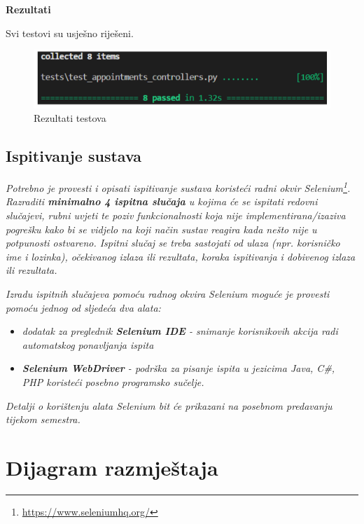	 \textbf{Rezultati}
	 
	 
	 Svi testovi su usješno riješeni.
	 
	 \begin{figure}[H]
				\includegraphics[scale=0.3]{slike/rezultati_testova.PNG} %
				\centering
				\caption{Rezultati testova}
				\label{fig:rezultati_testova}
			\end{figure}
	 
	 
			

			
			\subsection{Ispitivanje sustava}
			
			 \textit{Potrebno je provesti i opisati ispitivanje sustava koristeći radni okvir Selenium\footnote{\url{https://www.seleniumhq.org/}}. Razraditi \textbf{minimalno 4 ispitna slučaja} u kojima će se ispitati redovni slučajevi, rubni uvjeti te poziv funkcionalnosti koja nije implementirana/izaziva pogrešku kako bi se vidjelo na koji način sustav reagira kada nešto nije u potpunosti ostvareno. Ispitni slučaj se treba sastojati od ulaza (npr. korisničko ime i lozinka), očekivanog izlaza ili rezultata, koraka ispitivanja i dobivenog izlaza ili rezultata.\\ }
			 
			 \textit{Izradu ispitnih slučajeva pomoću radnog okvira Selenium moguće je provesti pomoću jednog od sljedeća dva alata:}
			 \begin{itemize}
			 	\item \textit{dodatak za preglednik \textbf{Selenium IDE} - snimanje korisnikovih akcija radi automatskog ponavljanja ispita	}
			 	\item \textit{\textbf{Selenium WebDriver} - podrška za pisanje ispita u jezicima Java, C\#, PHP koristeći posebno programsko sučelje.}
			 \end{itemize}
		 	\textit{Detalji o korištenju alata Selenium bit će prikazani na posebnom predavanju tijekom semestra.}
			
			\eject 
		
		
		\section{Dijagram razmještaja}
			
